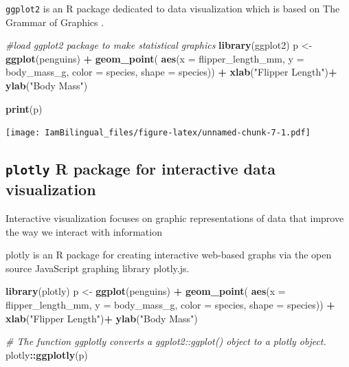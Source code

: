 \documentclass[]{book}
\newenvironment{Shaded}{\begin{snugshade}}{\end{snugshade}}
\newcommand{\CommentTok}[1]{\textcolor[rgb]{0.56,0.35,0.01}{\textit{#1}}}
\newcommand{\DataTypeTok}[1]{\textcolor[rgb]{0.13,0.29,0.53}{#1}}
\newcommand{\KeywordTok}[1]{\textcolor[rgb]{0.13,0.29,0.53}{\textbf{#1}}}
\newcommand{\NormalTok}[1]{#1}
\newcommand{\OperatorTok}[1]{\textcolor[rgb]{0.81,0.36,0.00}{\textbf{#1}}}
\newcommand{\StringTok}[1]{\textcolor[rgb]{0.31,0.60,0.02}{#1}}
\begin{document}
\texttt{ggplot2} is an R package dedicated to data visualization which is based on The Grammar of Graphics \citep{wilkinson2012grammar}.

\begin{Shaded}
\begin{Highlighting}[]
\CommentTok{#load ggplot2 package to make statistical graphics}
\KeywordTok{library}\NormalTok{(ggplot2)}
\NormalTok{p <-}\StringTok{ }\KeywordTok{ggplot}\NormalTok{(penguins) }\OperatorTok{+}
\StringTok{  }\KeywordTok{geom_point}\NormalTok{( }\KeywordTok{aes}\NormalTok{(}\DataTypeTok{x =}\NormalTok{ flipper_length_mm,}
                  \DataTypeTok{y =}\NormalTok{ body_mass_g,}
                  \DataTypeTok{color =}\NormalTok{ species,}
                  \DataTypeTok{shape =}\NormalTok{ species)) }\OperatorTok{+}
\StringTok{  }\KeywordTok{xlab}\NormalTok{(}\StringTok{"Flipper Length"}\NormalTok{)}\OperatorTok{+}
\StringTok{  }\KeywordTok{ylab}\NormalTok{(}\StringTok{"Body Mass"}\NormalTok{)}

\KeywordTok{print}\NormalTok{(p)}
\end{Highlighting}
\end{Shaded}

\texttt{[image: IamBilingual\_files/figure-latex/unnamed-chunk-7-1.pdf]}

\hypertarget{plotly-r-package-for-interactive-data-visualization}{%
\subsection{\texorpdfstring{\texttt{plotly} R package for interactive data visualization}{plotly R package for interactive data visualization}}\label{plotly-r-package-for-interactive-data-visualization}}

Interactive visualization focuses on graphic representations of data that improve the way we interact with information

plotly is an R package for creating interactive web-based graphs via the open source JavaScript graphing library plotly.js.

\begin{Shaded}
\begin{Highlighting}[]
\KeywordTok{library}\NormalTok{(plotly)}
\NormalTok{p <-}\StringTok{ }\KeywordTok{ggplot}\NormalTok{(penguins) }\OperatorTok{+}
\StringTok{  }\KeywordTok{geom_point}\NormalTok{( }\KeywordTok{aes}\NormalTok{(}\DataTypeTok{x =}\NormalTok{ flipper_length_mm,}
                  \DataTypeTok{y =}\NormalTok{ body_mass_g,}
                  \DataTypeTok{color =}\NormalTok{ species,}
                  \DataTypeTok{shape =}\NormalTok{ species)) }\OperatorTok{+}
\StringTok{  }\KeywordTok{xlab}\NormalTok{(}\StringTok{"Flipper Length"}\NormalTok{)}\OperatorTok{+}
\StringTok{  }\KeywordTok{ylab}\NormalTok{(}\StringTok{"Body Mass"}\NormalTok{)}

\CommentTok{# The function ggplotly converts a ggplot2::ggplot() object to a plotly object.}
\NormalTok{plotly}\OperatorTok{::}\KeywordTok{ggplotly}\NormalTok{(p)}
\end{Highlighting}
\end{Shaded}
\end{document}
